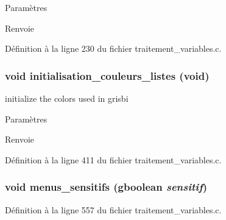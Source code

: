 \begin{DoxyParams}{Paramètres}
\item[{\em }]\end{DoxyParams}
\begin{DoxyReturn}{Renvoie}

\end{DoxyReturn}


Définition à la ligne 230 du fichier traitement\_\-variables.c.

\subsubsection[{initialisation\_\-couleurs\_\-listes}]{\setlength{\rightskip}{0pt plus 5cm}void initialisation\_\-couleurs\_\-listes (void)}\label{traitement__variables_8c_ad4677c922d0cacebadce1b8ce0d8ab5d}
initialize the colors used in grisbi


\begin{DoxyParams}{Paramètres}
\item[{\em }]\end{DoxyParams}
\begin{DoxyReturn}{Renvoie}

\end{DoxyReturn}


Définition à la ligne 411 du fichier traitement\_\-variables.c.

\subsubsection[{menus\_\-sensitifs}]{\setlength{\rightskip}{0pt plus 5cm}void menus\_\-sensitifs (gboolean {\em sensitif})}\label{traitement__variables_8c_a7221297bdb47010fd4b397a965100257}


Définition à la ligne 557 du fichier traitement\_\-variables.c.

